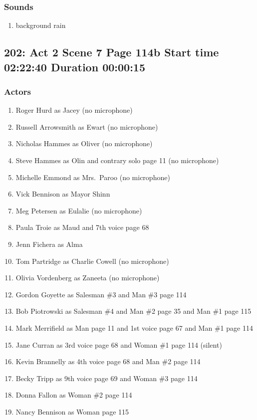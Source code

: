 \subsubsection{Sounds}
\begin{enumerate}
\item background rain
\end{enumerate}
\subsection{202: Act 2 Scene 7 Page 114b Start time 02:22:40 Duration 00:00:15}

\subsubsection{Actors}
\begin{enumerate}
\item Roger Hurd as Jacey (no microphone)
\item Russell Arrowsmith as Ewart (no microphone)
\item Nicholas Hammes as Oliver (no microphone)
\item Steve Hammes as Olin and contrary solo page 11 (no microphone)
\item Michelle Emmond as Mrs.~Paroo (no microphone)
\item Vick Bennison as Mayor Shinn
\item Meg Petersen as Eulalie (no microphone)
\item Paula Troie as Maud and 7th voice page 68
\item Jenn Fichera as Alma
\item Tom Partridge as Charlie Cowell (no microphone)
\item Olivia Vordenberg as Zaneeta (no microphone)
\item Gordon Goyette as Salesman \#3 and Man \#3 page 114
\item Bob Piotrowski as Salesman \#4 and Man \#2 page 35 and Man \#1 page 115
\item Mark Merrifield as Man page 11 and 1st voice page 67 and Man \#1 page 114
\item Jane Curran as 3rd voice page 68 and Woman \#1 page 114 (silent)
\item Kevin Brannelly as 4th voice page 68 and Man \#2 page 114
\item Becky Tripp as 9th voice page 69 and Woman \#3 page 114
\item Donna Fallon as Woman \#2 page 114
\item Nancy Bennison as Woman page 115
\end{enumerate}

